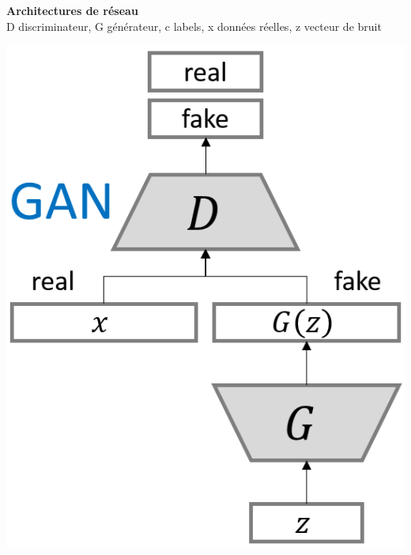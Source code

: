 \documentclass[a0,portrait]{a0poster}
\newcommand{\subtitle}[1]{\Large{\textbf{#1}}}
\begin{document}
\begin{multicols}{2}
\begin{tcolorbox}[colback=blue!5!white,colframe=blue!75!black,title={\section*{Types de GANs}}]
\subtitle{Architectures de réseau}\\
D discriminateur, G générateur, c labels, x données réelles, z vecteur de bruit
\begin{center}
\begin{minipage}{0.24\textwidth}
    \includegraphics[width=1.0\textwidth]{./GAN_normal.png}
\end{minipage}
\begin{minipage}{0.31\textwidth}

\end{minipage}
\end{center}
\end{tcolorbox}
\end{multicols}
\end{document}

